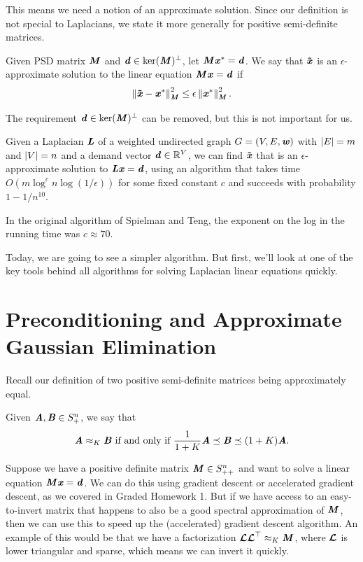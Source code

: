 This means we need a notion of an approximate solution.
Since our definition is not special to Laplacians, we state it more
generally for positive semi-definite matrices.
\begin{definition}
  Given PSD matrix $\boldsymbol{\mathit{M}}$ and $\boldsymbol{\mathit{d}} \in \ker(\boldsymbol{\mathit{M}})^{\perp}$, let
  $\boldsymbol{\mathit{M}} \boldsymbol{\mathit{x}}^* = \boldsymbol{\mathit{d}}$.
  We say that $\boldsymbol{\tilde{\mathit{x}}}$ is an $\epsilon$-approximate solution to the
  linear equation $\boldsymbol{\mathit{M}} \boldsymbol{\mathit{x}} = \boldsymbol{\mathit{d}}$ if
  \[
    \left\| \boldsymbol{\tilde{\mathit{x}}} - \boldsymbol{\mathit{x}}^* \right\|_{\boldsymbol{\mathit{M}}}^2 \leq \epsilon \left\| \boldsymbol{\mathit{x}}^* \right\|_{\boldsymbol{\mathit{M}}}^2.
  \]
\end{definition}

\begin{remark}
  The requirement $\boldsymbol{\mathit{d}} \in \ker(\boldsymbol{\mathit{M}})^{\perp}$ can be removed,
   but this is not important for us.
 \end{remark}

\begin{theorem}
Given a Laplacian $\boldsymbol{\mathit{L}}$ of a weighted undirected graph $G = (V,E,\boldsymbol{\mathit{w}})$
with $\left|E \right|=m$ and $\left|V \right| = n$ and a demand vector $\boldsymbol{\mathit{d}} \in \mathbb{R}^V$,
we can find $\boldsymbol{\tilde{\mathit{x}}}$ that is an $\epsilon$-approximate solution to
$\boldsymbol{\mathit{L}} \boldsymbol{\mathit{x}} = \boldsymbol{\mathit{d}}$, using an algorithm that takes time
$O(m \log^c n \log(1/\epsilon))$ for some fixed constant $c$ and succeeds with probability $1 - 1/n^{10}$.
\end{theorem}
In the original algorithm of Spielman and Teng, the exponent on the
log in the running time was $c \approx 70$.

Today, we are going to see a simpler algorithm. But first, we'll look
at one of the key tools behind all algorithms for solving Laplacian
linear equations quickly.


\section{Preconditioning and
Approximate Gaussian Elimination}
Recall our definition of two positive semi-definite matrices being
approximately equal.
\begin{definition}
  Given $\boldsymbol{\mathit{A}}, \boldsymbol{\mathit{B}} \in S_+^n$, we say that
  \[
    \boldsymbol{\mathit{A}} \approx_{K} \boldsymbol{\mathit{B}}
    \text{ if and only if }
    \frac{1}{1+ K} \boldsymbol{\mathit{A}} \preceq \boldsymbol{\mathit{B}} \preceq (1+ K) \boldsymbol{\mathit{A}}.
    \]
\end{definition}
Suppose we have a positive definite matrix $\boldsymbol{\mathit{M}} \in S_{++}^n$ and want to
solve a linear equation $\boldsymbol{\mathit{M}} \boldsymbol{\mathit{x}} =\boldsymbol{\mathit{d}}$.
We can do this using gradient descent or accelerated gradient
descent, as we covered in Graded Homework 1.
But if we have access to an easy-to-invert matrix that happens to also
be a good spectral approximation of $\boldsymbol{\mathit{M}}$, then we can use this to
speed up the (accelerated) gradient descent algorithm.
An example of this would be that we have a factorization
$\boldsymbol{\mathit{{\mathcal{L}}}}\boldsymbol{\mathit{{\mathcal{L}}}}^{\top} \approx_{K} \boldsymbol{\mathit{M}}$, where $\boldsymbol{\mathit{{\mathcal{L}}}}$ is
lower triangular and sparse, which means we can invert it quickly.

